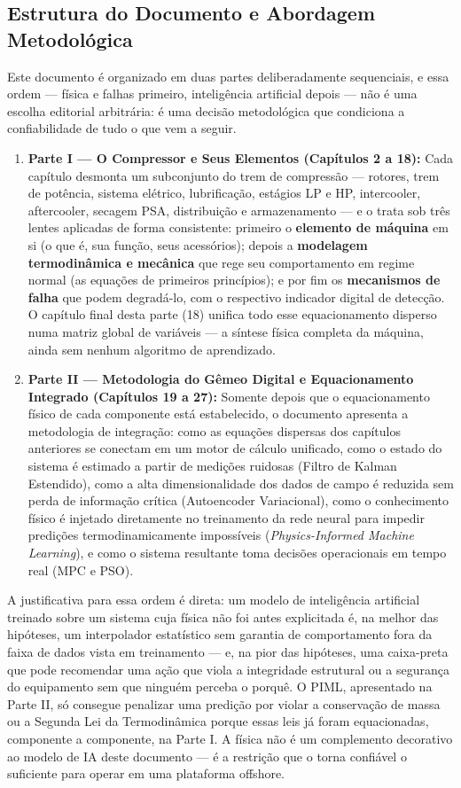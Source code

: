 \documentclass[12pt,a4paper]{article}
\numberwithin{equation}{section}
\numberwithin{table}{section}
\numberwithin{figure}{section}
\begin{document}
{	\subsection{\textbf{Estrutura do Documento e Abordagem Metodológica}}
	Este documento é organizado em duas partes deliberadamente sequenciais, e essa ordem — física e falhas primeiro, inteligência artificial depois — não é uma escolha editorial arbitrária: é uma decisão metodológica que condiciona a confiabilidade de tudo o que vem a seguir.

	\begin{enumerate}
		\item \textbf{Parte I — O Compressor e Seus Elementos (Capítulos 2 a 18):} Cada capítulo desmonta um subconjunto do trem de compressão — rotores, trem de potência, sistema elétrico, lubrificação, estágios LP e HP, intercooler, aftercooler, secagem PSA, distribuição e armazenamento — e o trata sob três lentes aplicadas de forma consistente: primeiro o \textbf{elemento de máquina} em si (o que é, sua função, seus acessórios); depois a \textbf{modelagem termodinâmica e mecânica} que rege seu comportamento em regime normal (as equações de primeiros princípios); e por fim os \textbf{mecanismos de falha} que podem degradá-lo, com o respectivo indicador digital de detecção. O capítulo final desta parte (18) unifica todo esse equacionamento disperso numa matriz global de variáveis — a síntese física completa da máquina, ainda sem nenhum algoritmo de aprendizado.
		\item \textbf{Parte II — Metodologia do Gêmeo Digital e Equacionamento Integrado (Capítulos 19 a 27):} Somente depois que o equacionamento físico de cada componente está estabelecido, o documento apresenta a metodologia de integração: como as equações dispersas dos capítulos anteriores se conectam em um motor de cálculo unificado, como o estado do sistema é estimado a partir de medições ruidosas (Filtro de Kalman Estendido), como a alta dimensionalidade dos dados de campo é reduzida sem perda de informação crítica (Autoencoder Variacional), como o conhecimento físico é injetado diretamente no treinamento da rede neural para impedir predições termodinamicamente impossíveis (\textit{Physics-Informed Machine Learning}), e como o sistema resultante toma decisões operacionais em tempo real (MPC e PSO).
	\end{enumerate}

	A justificativa para essa ordem é direta: um modelo de inteligência artificial treinado sobre um sistema cuja física não foi antes explicitada é, na melhor das hipóteses, um interpolador estatístico sem garantia de comportamento fora da faixa de dados vista em treinamento — e, na pior das hipóteses, uma caixa-preta que pode recomendar uma ação que viola a integridade estrutural ou a segurança do equipamento sem que ninguém perceba o porquê. O PIML, apresentado na Parte II, só consegue penalizar uma predição por violar a conservação de massa ou a Segunda Lei da Termodinâmica porque essas leis já foram equacionadas, componente a componente, na Parte I. A física não é um complemento decorativo ao modelo de IA deste documento — é a restrição que o torna confiável o suficiente para operar em uma plataforma offshore.

}
\end{document}
